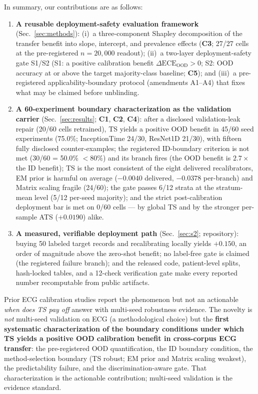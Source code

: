 \documentclass[review,12pt,nonatbib]{elsarticle}
\begin{document}
In summary, our contributions are as follows:
\begin{enumerate}
    \item \textbf{A reusable deployment-safety evaluation framework}
    (Sec.~\ref{sec:methods}): (i)~a three-component Shapley decomposition
    of the transfer benefit into slope, intercept, and prevalence effects
    (\textbf{C3}; 27/27 cells at the pre-registered $n=20{,}000$
    readout); (ii)~a two-layer deployment-safety gate S1/S2 (S1: a
    positive calibration benefit $\Delta\text{ECE}_{\text{OOD}}>0$; S2:
    OOD accuracy at or above the target majority-class baseline;
    \textbf{C5}); and (iii)~a pre-registered applicability-boundary
    protocol (amendments A1--A4) that fixes what may be claimed before
    unblinding.
    \item \textbf{A 60-experiment boundary characterization as the
    validation carrier} (Sec.~\ref{sec:results}; \textbf{C1},
    \textbf{C2}, \textbf{C4}): after a disclosed validation-leak repair
    (20/60 cells retrained), TS yields a positive OOD benefit in 45/60
    seed experiments (75.0\%; InceptionTime 24/30, ResNet1D 21/30), with
    fifteen fully disclosed counter-examples; the registered ID-boundary
    criterion is not met (30/60 = 50.0\% $<\!80\%$) and its branch fires
    (the OOD benefit is $2.7\times$ the ID benefit); TS is the most
    consistent of the eight delivered recalibrators, EM prior is harmful
    on average ($-0.0040$ delivered, $-0.0378$ per-branch) and Matrix
    scaling fragile (24/60); the gate passes 6/12 strata at the
    stratum-mean level (5/12 per-seed majority); and the strict
    post-calibration deployment bar is met on 0/60 cells --- by global
    TS and by the stronger per-sample ATS ($+0.0190$) alike.
    \item \textbf{A measured, verifiable deployment path}
    (Sec.~\ref{sec:s2}; repository): buying 50 labeled target records
    and recalibrating locally yields $+0.150$, an order of magnitude
    above the zero-shot benefit; no label-free gate is claimed (the
    registered failure branch); and the released code, patient-level
    splits, hash-locked tables, and a 12-check verification gate make
    every reported number recomputable from public artifacts.
\end{enumerate}

Prior ECG calibration studies report the phenomenon
\cite{barandas2023,zhang2022,physiolmeas2026,medrxiv2026} but not an
actionable \emph{when does TS pay off} answer with multi-seed robustness
evidence. The novelty is \emph{not} multi-seed validation on ECG (a
methodological choice) but the \textbf{first systematic characterization
of the boundary conditions under which TS yields a positive OOD
calibration benefit in cross-corpus ECG transfer}: the pre-registered OOD
quantification, the ID boundary condition, the method-selection boundary
(TS robust; EM prior and Matrix scaling weakest), the predictability
failure, and the discrimination-aware gate. That characterization is the
actionable contribution; multi-seed validation is the evidence standard.
\end{document}
